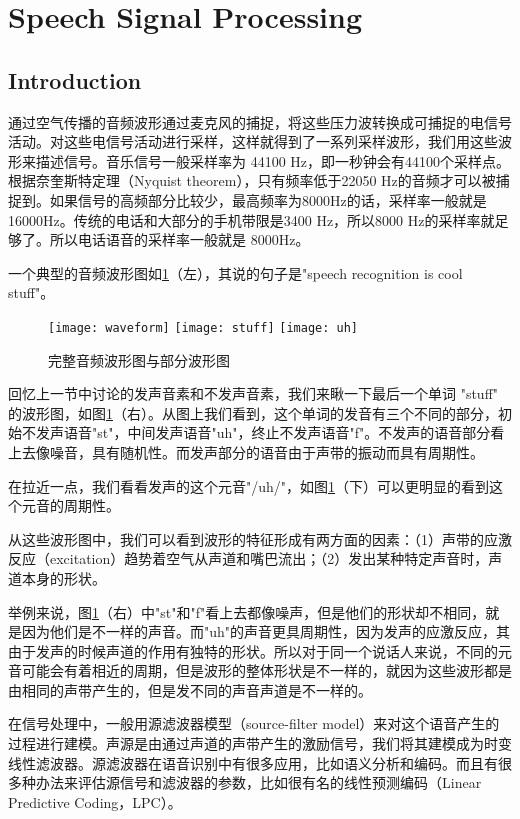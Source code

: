 \section{Speech Signal Processing}
\subsection{Introduction} %
\label{sub:introduction}
通过空气传播的音频波形通过麦克风的捕捉，将这些压力波转换成可捕捉的电信号活动。对这些电信号活动进行采样，这样就得到了一系列采样波形，我们用这些波形来描述信号。音乐信号一般采样率为 44100 Hz，即一秒钟会有44100个采样点。根据奈奎斯特定理（Nyquist theorem），只有频率低于22050 Hz的音频才可以被捕捉到。如果信号的高频部分比较少，最高频率为8000Hz的话，采样率一般就是16000Hz。传统的电话和大部分的手机带限是3400 Hz，所以8000 Hz的采样率就足够了。所以电话语音的采样率一般就是 8000Hz。

一个典型的音频波形图如\ref{fig:wavform}（左），其说的句子是"speech recognition is cool stuff"。
\begin{figure}[!ht]
  \centering
  \texttt{[image: waveform]}
  \hspace{1cm}
  \texttt{[image: stuff]}
  \hspace{1cm}
  \texttt{[image: uh]}
  \caption{完整音频波形图与部分波形图}
\label{fig:wavform}
\end{figure}

回忆上一节中讨论的发声音素和不发声音素，我们来瞅一下最后一个单词 "stuff" 的波形图，如图\ref{fig:wavform}（右）。从图上我们看到，这个单词的发音有三个不同的部分，初始不发声语音"st"，中间发声语音"uh"，终止不发声语音"f"。不发声的语音部分看上去像噪音，具有随机性。而发声部分的语音由于声带的振动而具有周期性。

在拉近一点，我们看看发声的这个元音"/uh/"，如图\ref{fig:wavform}（下）可以更明显的看到这个元音的周期性。

从这些波形图中，我们可以看到波形的特征形成有两方面的因素：（1）声带的应激反应（excitation）趋势着空气从声道和嘴巴流出；（2）发出某种特定声音时，声道本身的形状。

举例来说，图\ref{fig:wavform}（右）中"st"和"f"看上去都像噪声，但是他们的形状却不相同，就是因为他们是不一样的声音。而"uh"的声音更具周期性，因为发声的应激反应，其由于发声的时候声道的作用有独特的形状。所以对于同一个说话人来说，不同的元音可能会有着相近的周期，但是波形的整体形状是不一样的，就因为这些波形都是由相同的声带产生的，但是发不同的声音声道是不一样的。

在信号处理中，一般用源滤波器模型（source-filter model）来对这个语音产生的过程进行建模。声源是由通过声道的声带产生的激励信号，我们将其建模成为时变线性滤波器。源滤波器在语音识别中有很多应用，比如语义分析和编码。而且有很多种办法来评估源信号和滤波器的参数，比如很有名的线性预测编码（Linear Predictive Coding，LPC）。

